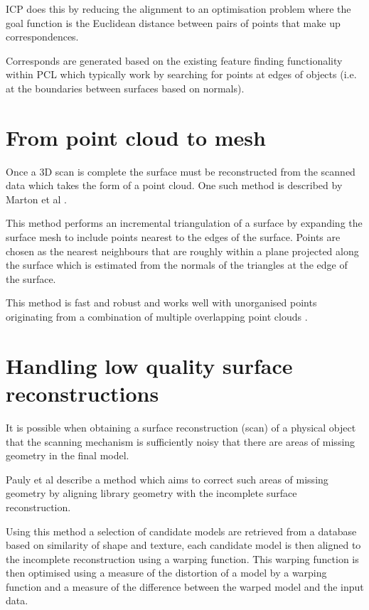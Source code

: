 \documentclass{entcs}
\begin{document}
ICP does this by reducing the alignment to an optimisation problem where the
goal function is the Euclidean distance between pairs of points that make up
correspondences.

Corresponds are generated based on the existing feature finding functionality
within PCL which typically work by searching for points at edges of objects
(i.e. at the boundaries between surfaces based on normals).

\section{From point cloud to mesh}
\label{sec:point_cloud_to_mesh}

Once a 3D scan is complete the surface must be reconstructed from the scanned
data which takes the form of a point cloud. One such method is described by
Marton et al \cite{Marton09ICRA}.

This method performs an incremental triangulation of a surface by expanding the
surface mesh to include points nearest to the edges of the surface. Points are
chosen as the nearest neighbours that are roughly within a plane projected along
the surface which is estimated from the normals of the triangles at the edge of
the surface.

This method is fast and robust and works well with unorganised points
originating from a combination of multiple overlapping point clouds
\cite{Rusu_ICRA2011_PCL}.

\section{Handling low quality surface reconstructions}
\label{sec:low_quality_reconstruction}

It is possible when obtaining a surface reconstruction (scan) of a physical
object that the scanning mechanism is sufficiently noisy that there are areas of
missing geometry in the final model.

Pauly et al \cite{Pauly2005} describe a method which aims to correct such areas
of missing geometry by aligning library geometry with the incomplete surface
reconstruction.

Using this method a selection of candidate models are retrieved from a database
based on similarity of shape and texture, each candidate model is then aligned
to the incomplete reconstruction using a warping function. This warping function
is then optimised using a measure of the distortion of a model by a warping
function and a measure of the difference between the warped model and the input
data.
\end{document}
